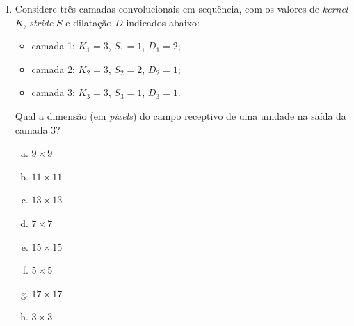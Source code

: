 \documentclass{dlproblemset}
\begin{document}
\begin{enumerate}[I)]
    \textbf{IV.} Duas convoluções $3 \times 3$ empilhadas têm o mesmo campo receptivo de uma única convolução $5 \times 5$, porém usam \emph{mais} parâmetros do que a $5 \times 5$.

    \textbf{V.} Uma convolução $1 \times 1$ preserva as dimensões espaciais e serve, entre outras coisas, para alterar o número de canais (combinação linear entre canais em cada posição).

    \begin{enumerate}[a)]
        \item Apenas I e V estão corretas.
        \item Apenas I, II, IV e V estão corretas.
        \item Apenas II, III e V estão corretas.
        \item Apenas I, II e V estão corretas.
        \item Apenas I, II e III estão corretas.
        \item Apenas I, III e IV estão corretas.
        \item Todas as afirmações estão corretas.
        \item Apenas II e V estão corretas.
    \end{enumerate}

    \item Considere três camadas convolucionais em sequência, com os valores de \textit{kernel} $K$, \textit{stride} $S$ e dilatação $D$ indicados abaixo:

    \begin{itemize}
        \item camada 1: $K_1 = 3$, $S_1 = 1$, $D_1 = 2$;
        \item camada 2: $K_2 = 3$, $S_2 = 2$, $D_2 = 1$;
        \item camada 3: $K_3 = 3$, $S_3 = 1$, $D_3 = 1$.
    \end{itemize}

    Qual a dimensão (em \textit{pixels}) do campo receptivo de uma unidade na saída da camada 3?

    \begin{enumerate}[a)]
        \item $9 \times 9$
        \item $11 \times 11$
        \item $13 \times 13$
        \item $7 \times 7$
        \item $15 \times 15$
        \item $5 \times 5$
        \item $17 \times 17$
        \item $3 \times 3$
    \end{enumerate}


\end{enumerate}
\end{document}
